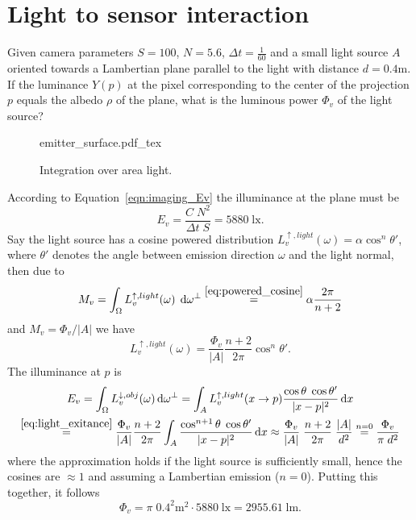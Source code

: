 \section{Light to sensor interaction}

Given camera parameters $S=100$, $N=5.6$, $\Delta t = \frac 1 {60}$
and a small light source $A$ oriented towards a
Lambertian plane parallel to the light with distance
$d = \num{0.4}\unit{\meter}$. If the luminance $Y(p)$ at the pixel corresponding
to the center of the projection $p$ equals the albedo $\rho$ of the plane,
what is the luminous power $\Phi_v$ of the light source?
\begin{figure}[t]
    \centering
    \def\svgwidth{0.9\linewidth}
    {emitter_surface.pdf_tex}
    \caption{Integration over area light.}
\end{figure}

According to Equation~\eqref{eqn:imaging_Ev} the illuminance at the plane must be 
\begin{displaymath}
  E_v = \frac{C\;N^2}{\Delta t\; S} = 5880\; \unit{\lux}.
\end{displaymath}
Say the light source has a cosine powered distribution
$L_v^{\uparrow,light}(\omega) = \alpha \cos^n \theta'$, where
$\theta'$ denotes the angle between emission direction $\omega$ and
the light normal, then due to
\begin{displaymath}
  M_v = \int_\Omega L_v^{\uparrow,light}(\omega) \; \mathop{}\!\mathrm{d} \omega^\bot \stackrel{\eqref{eq:powered_cosine}}= \alpha \frac{2\pi}{n+2}
\end{displaymath}
and $M_v = \Phi_v / |A|$
we have
\begin{equation}\label{eq:light_exitance}
  L_v^{\uparrow,light}(\omega) = \frac{\Phi_v}{|A|} \frac{n+2}{2\pi} \cos^n \theta'.
\end{equation}
The illuminance at $p$ is
\begin{multline*}
  E_v = \int_\Omega L_v^{\downarrow,obj}(\omega) \mathop{}\!\mathrm{d}\omega^{\bot} = \int_A L_v^{\uparrow,light}(x\to p) \frac{\cos \theta\; \cos \theta'}{|x-p|^2} \mathop{}\!\mathrm{d} x \\
  \stackrel{\eqref{eq:light_exitance}} =  \frac{\Phi_v}{|A|} \frac{n+2}{2\pi} \int_A  \frac{\cos^{n+1} \theta\; \cos \theta'}{|x-p|^2} \mathop{}\!\mathrm{d} x
  \approx \frac{ \Phi_v }{|A|}\; \frac{n+2}{2\pi}\; \frac{|A|}{d^2} \stackrel{n=0}= \frac{\Phi_v}{\pi\;d^2}
\end{multline*}
where the approximation holds if the light source is sufficiently small, hence the cosines are $\approx 1$ and assuming a Lambertian emission ($n=0$).
Putting this together, it follows 
\begin{displaymath}
  \Phi_v = \pi \; 0.4^2 \unit{\square\meter}\cdot 5880\; \unit{\lux} = 2955.61\; \unit{\lumen}.
\end{displaymath}

